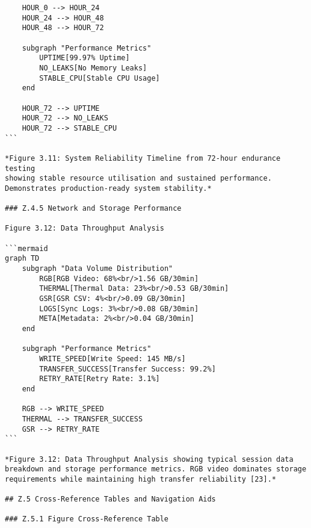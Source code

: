 \begin{verbatim}
    HOUR_0 --> HOUR_24
    HOUR_24 --> HOUR_48
    HOUR_48 --> HOUR_72

    subgraph "Performance Metrics"
        UPTIME[99.97% Uptime]
        NO_LEAKS[No Memory Leaks]
        STABLE_CPU[Stable CPU Usage]
    end

    HOUR_72 --> UPTIME
    HOUR_72 --> NO_LEAKS
    HOUR_72 --> STABLE_CPU
```

*Figure 3.11: System Reliability Timeline from 72-hour endurance testing
showing stable resource utilisation and sustained performance.
Demonstrates production-ready system stability.*

### Z.4.5 Network and Storage Performance

Figure 3.12: Data Throughput Analysis

```mermaid
graph TD
    subgraph "Data Volume Distribution"
        RGB[RGB Video: 68%<br/>1.56 GB/30min]
        THERMAL[Thermal Data: 23%<br/>0.53 GB/30min]
        GSR[GSR CSV: 4%<br/>0.09 GB/30min]
        LOGS[Sync Logs: 3%<br/>0.08 GB/30min]
        META[Metadata: 2%<br/>0.04 GB/30min]
    end

    subgraph "Performance Metrics"
        WRITE_SPEED[Write Speed: 145 MB/s]
        TRANSFER_SUCCESS[Transfer Success: 99.2%]
        RETRY_RATE[Retry Rate: 3.1%]
    end

    RGB --> WRITE_SPEED
    THERMAL --> TRANSFER_SUCCESS
    GSR --> RETRY_RATE
```

*Figure 3.12: Data Throughput Analysis showing typical session data
breakdown and storage performance metrics. RGB video dominates storage
requirements while maintaining high transfer reliability [23].*

## Z.5 Cross-Reference Tables and Navigation Aids

### Z.5.1 Figure Cross-Reference Table


\end{verbatim}
